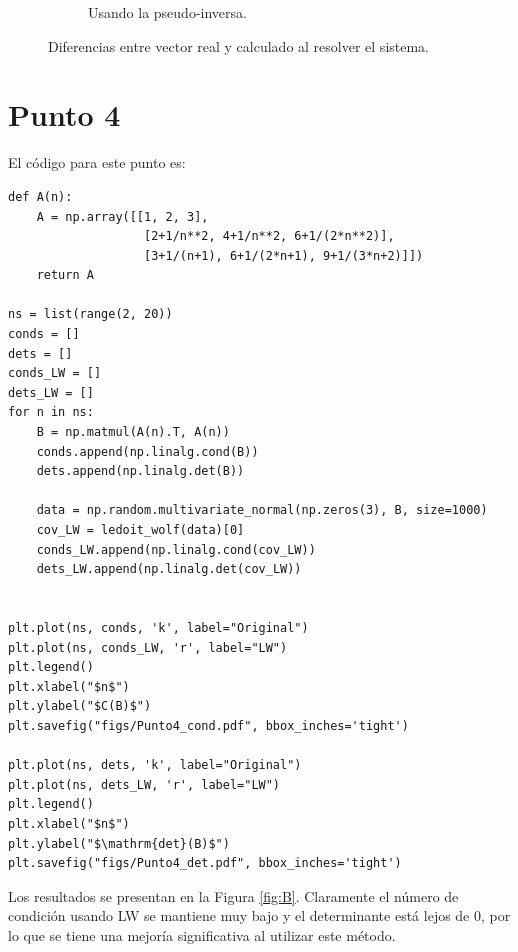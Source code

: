 \documentclass[fleqn]{article}
\begin{document}
\begin{figure}[H]
\begin{subfigure}[b]{0.45\textwidth}
        \caption{Usando la pseudo-inversa.}
        \label{fig:pinv}
    \end{subfigure}
    \caption{Diferencias entre vector real y calculado al resolver el sistema.}
    \label{fig:diffs}
\end{figure}

\section*{Punto 4}
El código para este punto es:
\begin{verbatim}
def A(n):
    A = np.array([[1, 2, 3],
                   [2+1/n**2, 4+1/n**2, 6+1/(2*n**2)],
                   [3+1/(n+1), 6+1/(2*n+1), 9+1/(3*n+2)]])
    return A

ns = list(range(2, 20))
conds = []
dets = []
conds_LW = []
dets_LW = []
for n in ns:
    B = np.matmul(A(n).T, A(n))
    conds.append(np.linalg.cond(B))
    dets.append(np.linalg.det(B))
    
    data = np.random.multivariate_normal(np.zeros(3), B, size=1000)
    cov_LW = ledoit_wolf(data)[0]
    conds_LW.append(np.linalg.cond(cov_LW))
    dets_LW.append(np.linalg.det(cov_LW))
    

plt.plot(ns, conds, 'k', label="Original")
plt.plot(ns, conds_LW, 'r', label="LW")
plt.legend()
plt.xlabel("$n$")
plt.ylabel("$C(B)$")
plt.savefig("figs/Punto4_cond.pdf", bbox_inches='tight')

plt.plot(ns, dets, 'k', label="Original")
plt.plot(ns, dets_LW, 'r', label="LW")
plt.legend()
plt.xlabel("$n$")
plt.ylabel("$\mathrm{det}(B)$")
plt.savefig("figs/Punto4_det.pdf", bbox_inches='tight')
\end{verbatim}

Los resultados se presentan en la Figura \ref{fig:B}. Claramente el número de condición usando LW se mantiene muy bajo y el determinante está lejos de 0, por lo que se tiene una mejoría significativa al utilizar este método.
\end{document}
